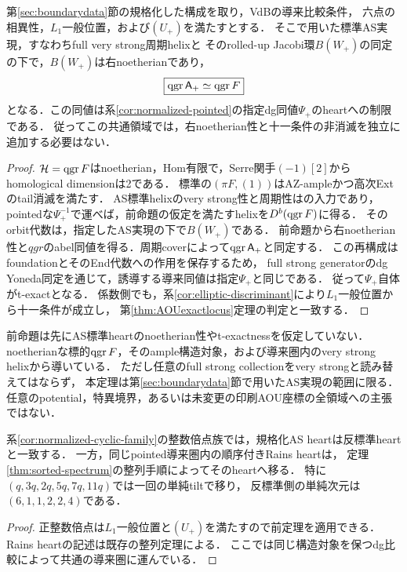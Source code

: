 \begin{theorem}\label{thm:normalized-abelian}
第\ref{sec:boundarydata}節の規格化した構成を取り，VdBの導来比較条件，
六点の相異性，$L_1$一般位置，および$(U_+)$を満たすとする．
そこで用いた標準AS実現，すなわちfull very strong周期helixと
そのrolled-up Jacobi環$B(W_+)$の同定の下で，$B(W_+)$は右noetherianであり，
\[
 \boxed{\operatorname{qgr}\mathsf A_+\simeq\operatorname{qgr} F}
\]
となる．この同値は系\ref{cor:normalized-pointed}の指定dg同値$\Psi_+$のheartへの制限である．
従ってこの共通領域では，右noetherian性と十一条件の非消滅を独立に追加する必要はない．
\end{theorem}
\begin{proof}
$\mathcal H=\operatorname{qgr} F$はnoetherian，Hom有限で，Serre関手$(-1)[2]$からhomological dimensionは2である．
標準の$(\pi F,(1))$はAZ-ampleかつ高次Extのtail消滅を満たす．
AS標準helixのvery strong性と周期性は\cite[Definition 3.1, (3.9)--(3.10)]{OU}の入力であり，
pointedな$\Psi_+^{-1}$で運べば，前命題の仮定を満たすhelixを$D^b(\operatorname{qgr} F)$に得る．
そのorbit代数は，指定したAS実現の下で$B(W_+)$である．
前命題から右noetherian性と$qgr$のabel同値を得る．周期coverによって$\operatorname{qgr}\mathsf A_+$と同定する．
この再構成はfoundationとそのEnd代数への作用を保存するため，
full strong generatorのdg Yoneda同定を通じて，誘導する導来同値は指定$\Psi_+$と同じである．
従って$\Psi_+$自体がt-exactとなる．
係数側でも，系\ref{cor:elliptic-discriminant}により$L_1$一般位置から十一条件が成立し，
第\ref{thm:AOUexactlocus}定理の判定と一致する．
\end{proof}
\begin{remark}[非循環性と範囲]
前命題は先にAS標準heartのnoetherian性やt-exactnessを仮定していない．
noetherianな標的$\operatorname{qgr} F$，そのample構造対象，および導来圏内のvery strong helixから導いている．
ただし任意のfull strong collectionをvery strongと読み替えてはならず，
本定理は第\ref{sec:boundarydata}節で用いたAS実現の範囲に限る．
任意のpotential，特異境界，あるいは未変更の印刷AOU座標の全領域への主張ではない．
\end{remark}

\begin{corollary}[整数倍点族の二つの比較]\label{cor:cyclic-AS-equality}
系\ref{cor:normalized-cyclic-family}の整数倍点族では，規格化AS heartは反標準heartと一致する．
一方，同じpointed導来圏内の順序付きRains heartは，
定理\ref{thm:sorted-spectrum}の整列手順によってそのheartへ移る．
特に$(q,3q,2q,5q,7q,11q)$では一回の単純tiltで移り，
反標準側の単純次元は$(6,1,1,2,2,4)$である．
\end{corollary}
\begin{proof}
正整数倍点は$L_1$一般位置と$(U_+)$を満たすので前定理を適用できる．
Rains heartの記述は既存の整列定理による．
ここでは同じ構造対象を保つdg比較によって共通の導来圏に運んでいる．
\end{proof}


